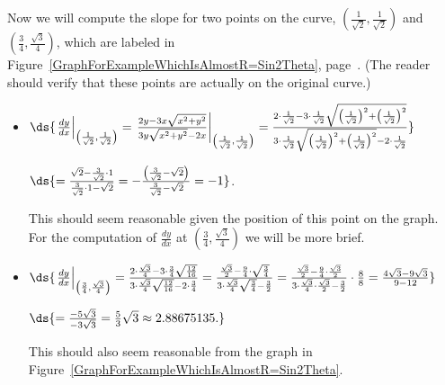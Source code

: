 Now we will compute the slope for two points on the curve, 
$\left(\frac1{\sqrt2},\frac1{\sqrt2}\right)$ and
$\left(\frac34,\frac{\sqrt{3}}4\right)$, which are labeled
in Figure~\ref{GraphForExampleWhichIsAlmostR=Sin2Theta},
page~\pageref{GraphForExampleWhichIsAlmostR=Sin2Theta}.
(The reader should verify that these points are actually on
the original curve.)
\begin{itemize}
\item $\ds{\left.\frac{dy}{dx}
       \right|_{\left(\frac1{\sqrt2},\frac1{\sqrt2}\right)}
  =\left.\frac{2y-3x\sqrt{x^2+y^2}}{3y\sqrt{x^2+y^2}-2x}
  \right|_{\left(\frac1{\sqrt2},\frac1{\sqrt2}\right)}
  =\frac{2\cdot\frac1{\sqrt2}-3\cdot\frac1{\sqrt2}
          \sqrt{\left(\frac{1}{\sqrt2}\right)^2
               +\left(\frac{1}{\sqrt2}\right)^2}}
         {3\cdot\frac1{\sqrt2}\sqrt{\left(\frac{1}{\sqrt2}\right)^2
               +\left(\frac{1}{\sqrt2}\right)^2}-2\cdot\frac1{\sqrt2}}}$

\qquad$\ds{=\frac{\sqrt2-\frac{3}{\sqrt2}\cdot1}{\frac3{\sqrt2}\cdot1-\sqrt2}
           =-\frac{\left(\frac3{\sqrt2}-\sqrt2\right)}
                  {\frac3{\sqrt2}-\sqrt2}=-1}$.

This should seem reasonable given the position of this point on the graph.
 For the computation of $\frac{dy}{dx}$ at
$\left(\frac34,\frac{\sqrt{3}}4\right)$ we will 
be more brief.  
\item $\ds{\left.\frac{dy}{dx}
       \right|_{\left(\frac34,\frac{\sqrt{3}}4\right)}
     =\frac{2\cdot\frac{\sqrt3}4-3\cdot\frac34\sqrt{\frac{12}{16}}}
           {3\cdot\frac{\sqrt{3}}4\sqrt{\frac{12}{16}}-2\cdot\frac34}
     =\frac{\frac{\sqrt3}{2}-\frac94\cdot\sqrt{\frac34}}
           {3\cdot\frac{\sqrt3}4\sqrt{\frac34}-\frac32}
     =\frac{\frac{\sqrt3}{2}-\frac94\cdot\frac{\sqrt3}2}
           {3\cdot\frac{\sqrt3}4\cdot\frac{\sqrt3}2-\frac32}\cdot\frac88
     =\frac{4\sqrt3-9\sqrt3}{9-12}}$

\qquad$\ds{=\frac{-5\sqrt3}{-3\sqrt3}=\frac53\sqrt3\approx2.88675135.}$

This should also seem reasonable from the graph in 
Figure~\ref{GraphForExampleWhichIsAlmostR=Sin2Theta}.
\end{itemize}




\label{ExampleWhichIsAlmostR=Sin2Theta}
\eex



